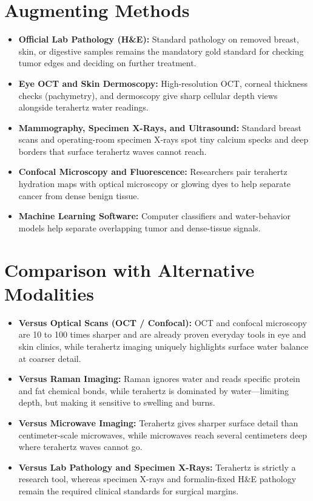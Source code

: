 \section{Augmenting Methods}
\begin{itemize}
  \item \textbf{Official Lab Pathology (H\&E):} Standard pathology on removed breast, skin, or digestive samples remains the mandatory gold standard for checking tumor edges and deciding on further treatment.
  \item \textbf{Eye OCT and Skin Dermoscopy:} High-resolution OCT, corneal thickness checks (pachymetry), and dermoscopy give sharp cellular depth views alongside terahertz water readings.
  \item \textbf{Mammography, Specimen X-Rays, and Ultrasound:} Standard breast scans and operating-room specimen X-rays spot tiny calcium specks and deep borders that surface terahertz waves cannot reach.
  \item \textbf{Confocal Microscopy and Fluorescence:} Researchers pair terahertz hydration maps with optical microscopy or glowing dyes to help separate cancer from dense benign tissue.
  \item \textbf{Machine Learning Software:} Computer classifiers and water-behavior models help separate overlapping tumor and dense-tissue signals.
\end{itemize}

\section{Comparison with Alternative Modalities}
\begin{itemize}
  \item \textbf{Versus Optical Scans (OCT / Confocal):} OCT and confocal microscopy are 10 to 100 times sharper and are already proven everyday tools in eye and skin clinics, while terahertz imaging uniquely highlights surface water balance at coarser detail.
  \item \textbf{Versus Raman Imaging:} Raman ignores water and reads specific protein and fat chemical bonds, while terahertz is dominated by water---limiting depth, but making it sensitive to swelling and burns.
  \item \textbf{Versus Microwave Imaging:} Terahertz gives sharper surface detail than centimeter-scale microwaves, while microwaves reach several centimeters deep where terahertz waves cannot go.
  \item \textbf{Versus Lab Pathology and Specimen X-Rays:} Terahertz is strictly a research tool, whereas specimen X-rays and formalin-fixed H\&E pathology remain the required clinical standards for surgical margins.
\end{itemize}

